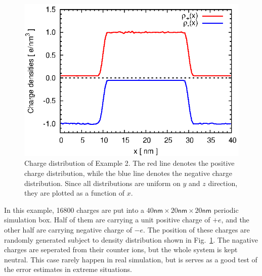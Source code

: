 \documentclass[aps,pre,preprint]{revtex4}
\begin{document}
\begin{figure}
  \centering
  \includegraphics[width=.48\textwidth]{fig/error.two_peaks_sep.box40x20x20.b1.000.r3.00.n6.K101x051x051/fig.rho.eps}
  \caption{Charge distribution of Example 2. The red line
    denotes the positive charge distribution, while the blue line
    denotes the negative charge distribution. Since all distributions
    are uniform on $y$ and $z$ direction, they are plotted as a
    function of $x$.}
  \label{fig:tmp-rho2}
\end{figure}

In this example, 16800 charges are put into a $40\textsf{nm}\times
20\textsf{nm}\times 20\textsf{nm}$ periodic simulation box. Half of
them are carrying a unit positive charge of $+e$, and the other half
are carrying negative charge of $-e$. The position of these charges
are randomly generated subject to density distribution shown in
Fig.~\ref{fig:tmp-rho2}. The nagative charges are seperated from their
counter ions, but the whole system is kept neutral. This case rarely
happen in real simulation, but is serves as a good test of the error
estimates in extreme situations.
\end{document}
